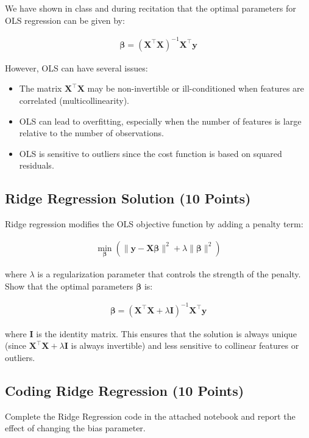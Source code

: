 \documentclass{article}
\begin{document}
We have shown in class and during recitation that the optimal parameters for OLS regression can be given by:

\begin{align}
\boldsymbol{\beta} = (\mathbf{X}^\top \mathbf{X})^{-1} \mathbf{X}^\top \mathbf{y}
\end{align}

However, OLS can have several issues:
\begin{itemize}
    \item The matrix $\mathbf{X}^\top \mathbf{X}$ may be non-invertible or ill-conditioned when features are correlated (multicollinearity).
    \item OLS can lead to overfitting, especially when the number of features is large relative to the number of observations.
    \item OLS is sensitive to outliers since the cost function is based on squared residuals.
\end{itemize}

\subsection{Ridge Regression Solution (10 Points)}
Ridge regression modifies the OLS objective function by adding a penalty term:

\begin{align}
\min_{\boldsymbol{\beta}} \left( \|\mathbf{y} - \mathbf{X} \boldsymbol{\beta}\|^2 + \lambda \|\boldsymbol{\beta}\|^2 \right)
\end{align}

where $\lambda$ is a regularization parameter that controls the strength of the penalty. Show that the optimal parameters $\boldsymbol{\beta}$ is:

\begin{align}
\boldsymbol{\beta} = (\mathbf{X}^\top \mathbf{X} + \lambda \mathbf{I})^{-1} \mathbf{X}^\top \mathbf{y}
\end{align}

where $\mathbf{I}$ is the identity matrix. This ensures that the solution is always unique (since $\mathbf{X}^\top \mathbf{X} + \lambda \mathbf{I}$ is always invertible) and less sensitive to collinear features or outliers.

\subsection{Coding Ridge Regression (10 Points)}
Complete the Ridge Regression code in the attached notebook and report the effect of changing the bias parameter.
\end{document}
